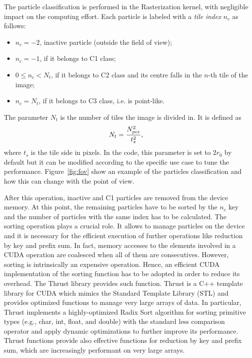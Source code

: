 \documentclass[11pt]{article}
\begin{document}
The particle classification is performed in the Rasterization kernel, with negligible impact
on the computing effort. Each particle is labeled
with a {\it tile index} $n_c$ as follows:
\begin{itemize}
\item 
$n_c = -2$, inactive particle (outside the field of view);
\item
$n_c = -1$, if it belongs to C1 class; 
\item
$0 \le n_c < N_t$, if it belongs to C2 class and its centre falls in the $n$-th tile of the image;  
\item
$n_c = N_t$, if it belongs to C3 class, i.e. is point-like.
\end{itemize}
The parameter $N_t$ is the number of tiles the image is divided in. It is defined as
\begin{equation}
N_t = {N_{pix}^2\over t_s^2},   
\end{equation}
where $t_s$ is the tile side in pixels. In the code, this parameter is set to $2r_0$ 
by default but it can be modified according to the specific use case to tune the performance. 
Figure~\ref{fig:fov} show an example of the particles classification and
how this can change with the point of view. 

After this operation, inactive and C1 particles are removed from the device memory. At this point, the remaining particles 
have to be sorted by the $n_c$ key and the number of particles with the same index has to
be calculated. 
The sorting operation plays a crucial role. It allows to manage particles on the 
device and it is necessary for the efficient execution of further operations like 
reduction by key and prefix sum. In fact, memory accesses to the elements involved 
in a CUDA operation are coalesced when all of them are consecutives. However, sorting 
is intrinsically an expensive operation. Hence, an efficient CUDA implementation of
the sorting function has to be adopted in order to reduce its overhead. 
The Thrust library \cite{thrusturl} provides such function. Thrust is a C++ template library 
for CUDA which mimics the Standard Template Library (STL) and provides 
optimized functions to manage very large arrays of data. In particular, Thrust 
implements a highly-optimized Radix Sort algorithm for sorting primitive types
(e.g., char, int, float, and double) with the standard less comparison operator and 
apply dynamic optimizations to further improve its performance.
Thrust functions provide also effective functions for reduction by key and prefix sum, which are 
increasingly performant on very large arrays.
\end{document}
